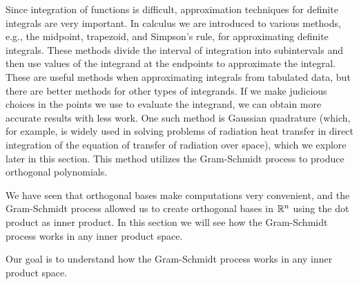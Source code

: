  \label{chap:gram_schmidt_ips}

\vspace*{-17 pt}

\vspace*{13 pt}

\label{sec:appl_gaussian_quad}

Since integration of functions is difficult, approximation techniques for definite integrals are very important. In calculus we are introduced to various methods, e.g., the midpoint, trapezoid, and Simpson's rule,  for approximating definite integrals. These methods divide the interval of integration into subintervals and then use values of the integrand at the endpoints to approximate the integral. These are useful methods when approximating integrals from tabulated data, but there are better methods for other types of integrands. If we make judicious choices in the points we use to evaluate the integrand, we can obtain more accurate results with less work. One such method is Gaussian quadrature (which, for example, is widely used in solving problems of radiation heat transfer in direct integration of the equation of transfer of radiation over space), which we explore later in this section. This method utilizes the Gram-Schmidt process to produce orthogonal polynomials.

\label{sec:gram_schmidt_intro}

We have seen that orthogonal bases make computations very convenient, and the Gram-Schmidt process allowed us to create orthogonal bases in $\mathbb{R}^n$ using the dot product as inner product. In this section we will see how the Gram-Schmidt process works in any inner product space.  


\label{sec:gram_schmidt_inner_prod}

Our goal is to understand how the Gram-Schmidt process works in any inner product space. 

